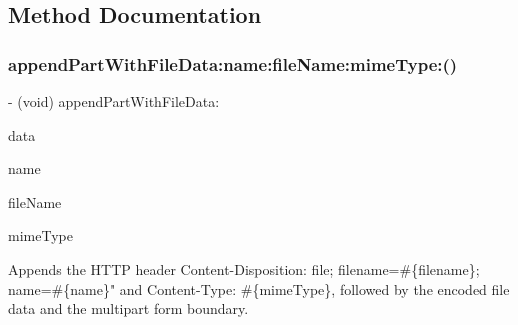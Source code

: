 \subsection{Method Documentation}
\mbox{\label{protocol_a_f_multipart_form_data-p_a47b204592fb8a4ad0750ee4c24baa43f}} 
\subsubsection{\texorpdfstring{append\+Part\+With\+File\+Data\+:name\+:file\+Name\+:mime\+Type\+:()}{appendPartWithFileData:name:fileName:mimeType:()}\hspace{0.1cm}{\footnotesize\ttfamily [1/3]}}
{\footnotesize\ttfamily -\/ (void) append\+Part\+With\+File\+Data\+: \begin{DoxyParamCaption}\item[{(N\+S\+Data $\ast$)}]{data }\item[{name:(N\+S\+String $\ast$)}]{name }\item[{fileName:(N\+S\+String $\ast$)}]{file\+Name }\item[{mimeType:(N\+S\+String $\ast$)}]{mime\+Type }\end{DoxyParamCaption}}

Appends the H\+T\+TP header {\ttfamily Content-\/\+Disposition\+: file; filename=\#\{filename\}; name=\#\{name\}"} and {\ttfamily Content-\/\+Type\+: \#\{mime\+Type\}}, followed by the encoded file data and the multipart form boundary.


